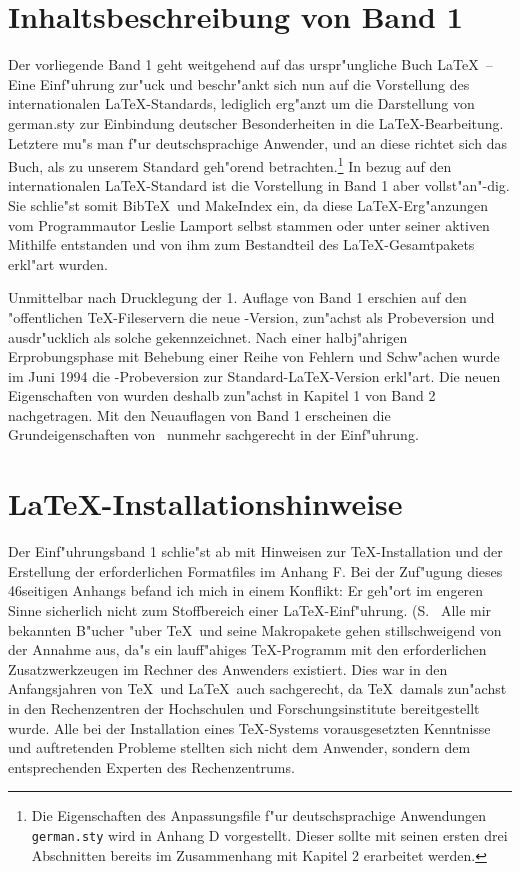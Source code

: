 \documentclass{article}
\begin{document}
\section{Inhaltsbeschreibung von Band 1}
Der vorliegende Band 1 \cite{hk1} geht weitgehend auf das urspr"ungliche Buch 
\LaTeX\ -- Eine Einf"uhrung \cite{hku} zur"uck und beschr"ankt sich nun
auf die Vorstellung des internationalen \LaTeX-Standards, lediglich erg"anzt
um die Darstellung von german.sty zur Einbindung deutscher 
Besonderheiten in die \LaTeX-Bearbeitung. Letztere mu"s man f"ur 
deutschsprachige Anwender, und an diese richtet sich das Buch, als zu
unserem Standard geh"orend betrachten.\footnote{Die Eigenschaften des
Anpassungsfile f"ur deutschsprachige Anwendungen \texttt{german.sty} wird
in Anhang D vorgestellt. Dieser sollte mit seinen ersten drei Abschnitten 
bereits im Zusammenhang mit Kapitel 2 erarbeitet werden.}
In bezug auf den internationalen \LaTeX-Standard ist die Vorstellung
in Band 1 aber vollst"an"-dig. Sie schlie"st somit Bib\TeX\
und MakeIndex ein, da diese \LaTeX-Erg"anzungen
vom Programmautor Leslie Lamport selbst stammen oder unter seiner
aktiven Mithilfe entstanden und von ihm zum Bestandteil des \LaTeX-Gesamtpakets 
erkl"art wurden.

Unmittelbar nach Drucklegung der 1. Auflage von Band 1 erschien auf den
"offentlichen \TeX-Fileservern die neue \LaTeXe-Version, zun"achst als
Probeversion und ausdr"ucklich als solche gekennzeichnet. Nach einer
halbj"ahrigen Erprobungsphase mit Behebung einer Reihe von Fehlern und
Schw"achen wurde im Juni 1994 die \LaTeXe-Probeversion zur
Standard-\LaTeX-Version erkl"art. Die neuen Eigenschaften von \LaTeXe wurden
deshalb zun"achst in Kapitel 1 von Band 2 nachgetragen. Mit den Neuauflagen
von Band 1 erscheinen die Grundeigenschaften
von \LaTeXe\ nunmehr sachgerecht in der Einf"uhrung. 

\section{\LaTeX-Installationshinweise}
Der Einf"uhrungsband 1 schlie"st ab mit Hinweisen zur \TeX-Installation und der
Erstellung der erforderlichen Formatfiles im Anhang F. 
Bei der Zuf"ugung dieses 46seitigen Anhangs befand ich mich in einem Konflikt:
Er geh"ort im engeren Sinne sicherlich nicht zum Stoffbereich einer 
\LaTeX-Einf"uhrung. (S.~\cite[Anh. F]{hk1}
Alle mir bekannten B"ucher "uber \TeX\ und seine Makropakete gehen
stillschweigend von der Annahme aus, da"s ein lauff"ahiges \TeX-Programm
mit den erforderlichen Zusatzwerkzeugen im Rechner des Anwenders existiert.
Dies war in den Anfangsjahren von \TeX\ und \LaTeX\ auch sachgerecht, da
\TeX\ damals zun"achst in den Rechenzentren der Hochschulen und 
Forschungsinstitute bereitgestellt wurde. Alle bei der Installation eines
\TeX-Systems vorausgesetzten Kenntnisse und auftretenden Probleme stellten
sich nicht dem Anwender, sondern dem entsprechenden Experten des
Rechenzentrums.
\end{document}
